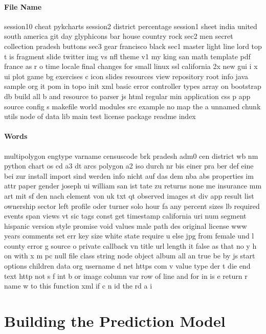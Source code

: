 \documentclass[paper=A4,pagesize=auto,12pt,headinclude=true,footinclude=true,BCOR=0mm,DIV=calc]{scrartcl}
\begin{document}
	\paragraph{File Name}
	session10 cheat pykcharts session2 district percentage session1 sheet india united south america git day glyphicons bar house country rock sec2 men secret collection pradesh buttons sec3 gear francisco black sec1 master light line lord top t is fragment slide twitter img vs nfl theme v1 my king san math template pdf france as r o time locale final changes for small linux ssl california 2x new gui i x ui plot game bg exercises c icon slides resources view repository root info java sample org it pom in topo init xml basic error controller types array on bootstrap db build all b and resource to parser js html regular min application css p app source config s makefile world modules src example no map the a unnamed chunk utils node of data lib main test license package readme index 
	
	\paragraph{Words}
	multipolygon engtype varname censuscode brk pradesh adm0 cen district wb nm python chart os cd a3 dt arcs polygon a2 iso durch nr bis einer pra ber def eine bei zur install import sind werden info nicht auf das dem nba abs properties im attr paper gender joseph ui william san ist tate zu returns none me insurance mm art mit sf den nach element von uk txt qt observed images st div app result list ownership sector left profile oder turner solo hour fa any percent sizes lb required events span views vt sic tags const get timestamp california uri num segment hispanic version style promise void values male path des original license www years comments set err key size white state require u else jpg from female und l county error g source o private callback vn title url length it false as that no y h on with x m pc null file class string node object album all an true be by js start options children data org username d net https com v value type der t die end text http not s f int b or image column var row of line and for in is e return r name w to this function xml if c n id the rd a i
	
	\section{Building the Prediction Model}
	
\end{document}
